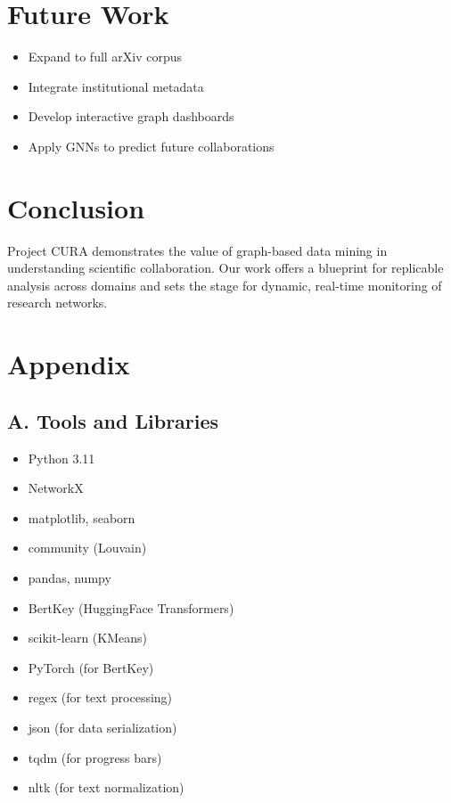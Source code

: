 \documentclass[12pt]{article}
\begin{document}
\section{Future Work}
\begin{itemize}
\item Expand to full arXiv corpus
\item Integrate institutional metadata
\item Develop interactive graph dashboards
\item Apply GNNs to predict future collaborations
\end{itemize}

\section{Conclusion}
Project CURA demonstrates the value of graph-based data mining in understanding scientific collaboration. Our work offers a blueprint for replicable analysis across domains and sets the stage for dynamic, real-time monitoring of research networks.

\newpage

\section*{Appendix}
\subsection*{A. Tools and Libraries}
\begin{itemize}
\item Python 3.11
\item NetworkX
\item matplotlib, seaborn
\item community (Louvain)
\item pandas, numpy
\item BertKey (HuggingFace Transformers)
\item scikit-learn (KMeans)
\item PyTorch (for BertKey)
\item regex (for text processing)
\item json (for data serialization)
\item tqdm (for progress bars)
\item nltk (for text normalization)
\end{itemize}
\end{document}
